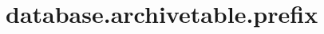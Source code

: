 \section{database.archivetable.prefix}
\label{configuration:DatabaseArchivetablePrefix}
\AvailableInJavaOnly{\TODO}